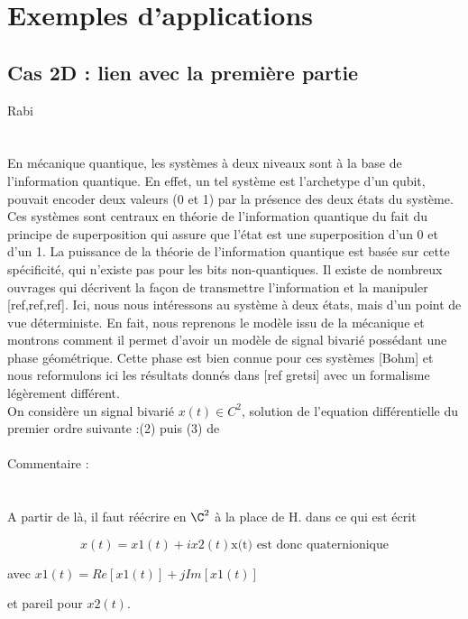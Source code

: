 \section{\todo Exemples d'applications} \label{sec:exemples_appli}

\subsection{\todo Cas 2D : lien avec la première partie} \label{subsec:ex-2D}

Rabi
\\ \\ \\
En mécanique quantique, les systèmes à deux niveaux sont à la base de l'information quantique. En effet, un tel système est l'archetype d'un qubit, pouvait encoder deux valeurs (0 et 1) par la présence des deux états du système. Ces systèmes sont centraux en théorie de l'information quantique du fait du principe de superposition qui assure que l'état est une superposition d'un 0 et d'un 1. La puissance de la théorie de l'information quantique est basée sur cette spécificité, qui n'existe pas pour les bits non-quantiques. Il existe de nombreux ouvrages qui décrivent la façon de transmettre l'information et la manipuler [ref,ref,ref].
Ici, nous nous intéressons au système à deux états, mais d'un point de vue déterministe. En fait, nous reprenons le modèle issu de la mécanique et montrons comment il permet d'avoir un modèle de signal bivarié possédant une phase géométrique. Cette phase est bien connue pour ces systèmes [Bohm] et nous reformulons ici les résultats donnés dans [ref gretsi] avec un formalisme légèrement différent.
\\ 

On considère un signal bivarié $x(t) \in C^2$, solution de l'equation différentielle du premier ordre suivante :(2) puis (3) de  \cite{le_bihan_modephysiques_2023}
\\ \\

Commentaire : 
\\ \\ \\
A partir de là, il faut réécrire en $\C^2$ à la place de H.
dans ce qui est écrit 

\[x(t) = x1(t) + i x2(t) \text{x(t) est donc quaternionique}\] 

avec $x1(t) = Re[x1(t)] + j Im[x1(t)]$

et pareil pour $x2(t)$.

